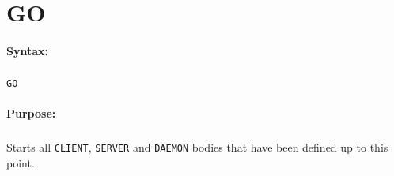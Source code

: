 
\newpage
\section{GO}
\label{cmd:GO}

\paragraph{Syntax:}
\subparagraph{}
\texttt{GO}

\paragraph{Purpose:}
\subparagraph{}
Starts all \texttt{CLIENT}, \texttt{SERVER} and \texttt{DAEMON} bodies that 
have been defined up to this point. 

